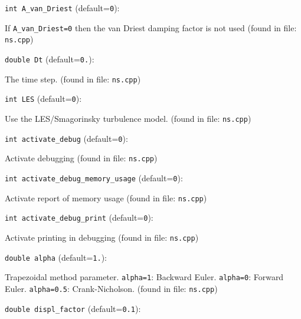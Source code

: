 \item\verb+int A_van_Driest+ {\rm(default=\verb|0|)}:

If {\tt A\_van\_Driest=0} then the van Driest
   damping factor is not used 
 (found in file: \verb+ns.cpp+)
\item\verb+double Dt+ {\rm(default=\verb|0.|)}:

The time step.
 (found in file: \verb+ns.cpp+)
\item\verb+int LES+ {\rm(default=\verb|0|)}:

Use the LES/Smagorinsky turbulence model. 
 (found in file: \verb+ns.cpp+)
\item\verb+int activate_debug+ {\rm(default=\verb|0|)}:

Activate debugging
 (found in file: \verb+ns.cpp+)
\item\verb+int activate_debug_memory_usage+ {\rm(default=\verb|0|)}:

Activate report of memory usage
 (found in file: \verb+ns.cpp+)
\item\verb+int activate_debug_print+ {\rm(default=\verb|0|)}:

Activate printing in debugging
 (found in file: \verb+ns.cpp+)
\item\verb+double alpha+ {\rm(default=\verb|1.|)}:

Trapezoidal method parameter. \verb+alpha=1+:
Backward Euler. \verb+alpha=0+: Forward Euler.
\verb+alpha=0.5+: Crank-Nicholson. 
 (found in file: \verb+ns.cpp+)
\item\verb+double displ_factor+ {\rm(default=\verb|0.1|)}:

